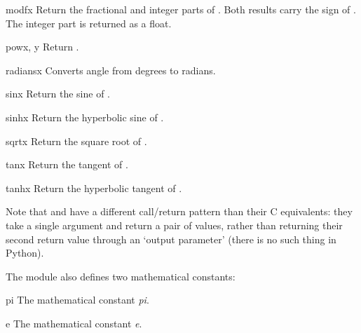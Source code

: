 \begin{funcdesc}{modf}{x}
Return the fractional and integer parts of .  Both results
carry the sign of .  The integer part is returned as a float.
\end{funcdesc}

\begin{funcdesc}{pow}{x, y}
Return .
\end{funcdesc}

\begin{funcdesc}{radians}{x}
Converts angle  from degrees to radians.
\end{funcdesc}

\begin{funcdesc}{sin}{x}
Return the sine of .
\end{funcdesc}

\begin{funcdesc}{sinh}{x}
Return the hyperbolic sine of .
\end{funcdesc}

\begin{funcdesc}{sqrt}{x}
Return the square root of .
\end{funcdesc}

\begin{funcdesc}{tan}{x}
Return the tangent of .
\end{funcdesc}

\begin{funcdesc}{tanh}{x}
Return the hyperbolic tangent of .
\end{funcdesc}

Note that  and  have a different
call/return pattern than their C equivalents: they take a single
argument and return a pair of values, rather than returning their
second return value through an `output parameter' (there is no such
thing in Python).

The module also defines two mathematical constants:

\begin{datadesc}{pi}
The mathematical constant \emph{pi}.
\end{datadesc}

\begin{datadesc}{e}
The mathematical constant \emph{e}.
\end{datadesc}

\begin{seealso}
\end{seealso}
